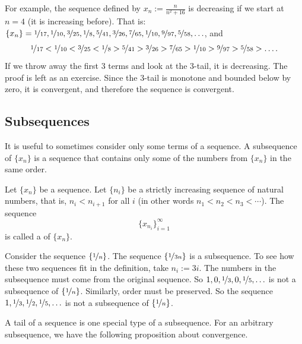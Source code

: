 For example, the sequence defined by $x_n := \frac{n}{n^2+16}$ is decreasing
if we start at $n=4$ (it is increasing before).  That is:
$\{ x_n \} =
\nicefrac{1}{17},
\nicefrac{1}{10},
\nicefrac{3}{25},
\nicefrac{1}{8},
\nicefrac{5}{41},
\nicefrac{3}{26},
\nicefrac{7}{65},
\nicefrac{1}{10},
\nicefrac{9}{97},
\nicefrac{5}{58},\ldots$, and 
\begin{equation*}
\nicefrac{1}{17} <
\nicefrac{1}{10} <
\nicefrac{3}{25} <
\nicefrac{1}{8} >
\nicefrac{5}{41} >
\nicefrac{3}{26} >
\nicefrac{7}{65} >
\nicefrac{1}{10} >
\nicefrac{9}{97} >
\nicefrac{5}{58} > \ldots .
\end{equation*}
If we throw away the first 3 terms
and look at the 3-tail, it is decreasing.  The proof is left as an exercise.  Since the 3-tail
is monotone and bounded below by zero, it is convergent, and therefore the sequence is convergent.

\subsection{Subsequences}

It is useful to sometimes consider only some terms of a sequence.
A subsequence of $\{ x_n \}$ is a sequence that contains
only some of the numbers from $\{ x_n \}$ in the same order.

\begin{defn}
Let $\{ x_n \}$ be a sequence.
Let $\{ n_i \}$ be a strictly increasing sequence of natural
numbers, that is, $n_i < n_{i+1}$ for all $i$ (in other words $n_1 < n_2 < n_3 < \cdots$).  
The sequence
\begin{equation*}
\{ x_{n_i} \}_{i=1}^\infty
\end{equation*}
is called 
a \emph{} of $\{ x_n \}$.
\end{defn}

Consider the sequence $\{ \nicefrac{1}{n} \}$.  The sequence
$\{ \nicefrac{1}{3n} \}$ is a subsequence.  To see how these two
sequences fit in the definition, take $n_i := 3i$.  
The numbers in the
subsequence must come from the original sequence.  So $1,0,\nicefrac{1}{3},0,
\nicefrac{1}{5},\ldots$
is not a subsequence of $\{ \nicefrac{1}{n} \}$.  Similarly, order
must be preserved.  So
the sequence $1,\nicefrac{1}{3},\nicefrac{1}{2},\nicefrac{1}{5},\ldots$
is not a subsequence of $\{ \nicefrac{1}{n} \}$.

A tail of a sequence is one special type of a subsequence.  For an arbitrary
subsequence, we have the following proposition about convergence.

